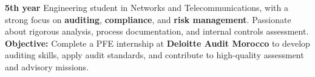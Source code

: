 
\begin{cvparagraph}

    \textbf{5th year} Engineering student in Networks and Telecommunications, with a strong focus on \textbf{auditing}, \textbf{compliance}, and \textbf{risk management}. Passionate about rigorous analysis, process documentation, and internal controls assessment.
    \newline
    \textbf{Objective:} Complete a PFE internship at \textbf{Deloitte Audit Morocco} to develop auditing skills, apply audit standards, and contribute to high-quality assessment and advisory missions.

\end{cvparagraph}